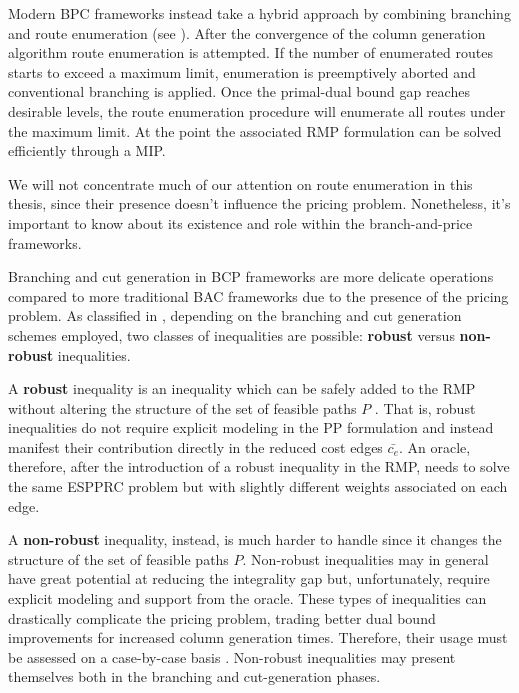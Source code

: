 Modern BPC frameworks instead take a hybrid approach by combining branching and route enumeration
(see \cite{pessoa2008, pessoa2009, pecin2017, pessoa2020}).
After the convergence of the column generation algorithm route enumeration is attempted.
If the number of enumerated routes starts to exceed a maximum limit, enumeration
is preemptively aborted and conventional branching is applied.
Once the primal-dual bound gap reaches desirable levels, the route enumeration
procedure will enumerate all routes under the maximum limit.
At the point the associated RMP formulation can be solved efficiently through a MIP.

We will not concentrate much of our attention on route enumeration in this
thesis, since their presence doesn't influence the pricing problem.
Nonetheless, it's important to know about its existence and role within
the branch-and-price frameworks.

\medskip

Branching and cut generation in BCP frameworks are more delicate operations
compared to more traditional BAC frameworks due to the presence of the pricing problem.
As classified in \textcite{dearagao2003},
depending on the branching and cut generation schemes employed,
two classes of inequalities are possible:
\textbf{robust} versus \textbf{non-robust} inequalities.

A \textbf{robust} inequality is an inequality
which can be safely added to the RMP
without altering the structure of the set of feasible paths $P$ \parencite{fukasawa2006}.
That is,
robust inequalities do not require explicit modeling in the PP formulation
and instead manifest their contribution directly in the reduced cost edges $\bar{c_e}$.
An oracle, therefore,
after the introduction of a robust inequality in the RMP,
needs to solve the same ESPPRC problem but with slightly different weights associated on each edge.

A \textbf{non-robust} inequality, instead,
is much harder to handle since it changes the structure of the set of feasible paths $P$.
Non-robust inequalities may in general have great potential at reducing the integrality gap
but,
unfortunately, require explicit modeling and support from the oracle.
These types of inequalities can drastically complicate the pricing problem,
trading better dual bound improvements for increased column generation times.
Therefore, their usage must be assessed on a case-by-case basis \parencite{desaulniers2011}.
Non-robust inequalities may present themselves both in the branching and cut-generation phases.

